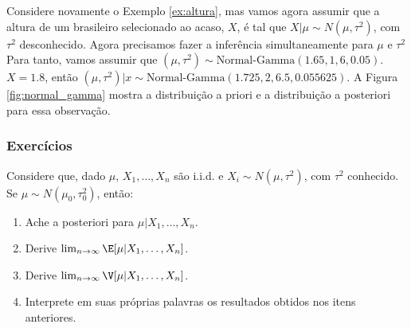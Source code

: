 \begin{example}
 Considere novamente o Exemplo
 \ref{ex:altura}, mas vamos agora assumir 
 que
 a altura de um brasileiro selecionado ao acaso, $X$, é tal que
$X|\mu \sim N(\mu,\tau^2)$, com $\tau^2$ desconhecido.
 Agora precisamos fazer a inferência simultaneamente para  $\mu$
 e $\tau^2$
 Para tanto, vamos assumir que
$(\mu,\tau^2) \sim \mbox{Normal-Gamma}(1.65,1,6,0.05)$.
$X=1.8$, então
$(\mu,\tau^2)|x   \sim \mbox{Normal-Gamma}(1.725,2,6.5,0.055625)$. A Figura \ref{fig:normal_gamma} mostra a distribuição a priori e a distribuição a posteriori para essa observação. 

\begin{knitrout}
\color{fgcolor}\begin{kframe}
\begin{alltt}

 \hlkwb{<-} \hlstd{(}\hlstd{=}\hlstd{(}\hlstd{,}\hlstd{,} \hlstd{=} \hlstd{),}
                             \hlstd{=}\hlstd{(}\hlstd{,}\hlstd{,} \hlstd{=} \hlstd{))}
\end{alltt}
\end{kframe}
\end{knitrout}
\end{example}

\subsubsection*{Exercícios}

\begin{exercise}
 \label{ex:conjugate-normal-normal}
 Considere que, dado $\mu$,
 $X_{1},\ldots,X_{n}$ são i.i.d. e
 $X_{i} \sim N(\mu,\tau^{2})$, com
 $\tau^{2}$ conhecido. Se
 $\mu \sim N(\mu_{0},\tau_{0}^{2})$, então:
 \begin{enumerate}[label=(\alph*)]
  \item Ache a posteriori para
  $\mu|X_{1},\ldots,X_{n}$.
  \item Derive $\lim_{n \rightarrow \infty}\E[\mu|X_{1},\ldots,X_{n}]$.
  \item Derive $\lim_{n \rightarrow \infty}\V[\mu|X_{1},\ldots,X_{n}]$.
  \item Interprete em suas próprias palavras os
  resultados obtidos nos itens anteriores.
 \end{enumerate}
\end{exercise}

